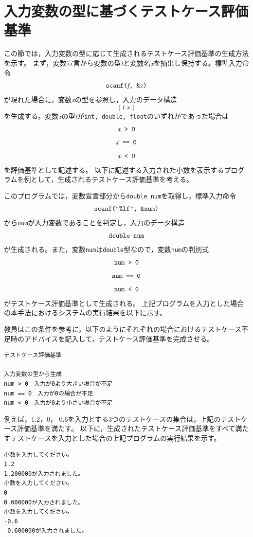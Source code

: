 \documentclass{tpu-sotu}
\begin{document}
\section{入力変数の型に基づくテストケース評価基準}
この節では，入力変数の型に応じて生成されるテストケース評価基準の生成方法を示す。
まず，変数宣言から変数の型{\it t}と変数名{\it x}を抽出し保持する。標準入力命令\\
\[ 
\mbox{{\tt {scanf({\it f}, \&{\it x})}}}
\]
が現れた場合に，変数{\it x}の型を参照し，入力のデータ構造\\
\[
(t\:x)
\]
を生成する。変数{\it x}の型{\it t}が{\tt int, double, float}のいずれかであった場合は\\
\[ 
\mbox{\tt{{\it x} > 0}} 
\]
\[
\mbox{\tt{{\it x} == 0}}
\]
\[
\mbox{\tt{{\it x} < 0}}
\]
を評価基準として記述する。
以下に記述する入力された小数を表示するプログラムを例として，生成されるテストケース評価基準を考える。

このプログラムでは，変数宣言部分から{\tt double num}を取得し，標準入力命令\\
\[ 
\mbox{{\tt {scanf("\%lf", \&num)}}}
\]
から{\tt num}が入力変数であることを判定し，入力のデータ構造\\
\[
\mbox{{\tt double num}}
\]
が生成される。また，変数{\tt num}は{\tt double}型なので，変数{\tt num}の判別式\\
\[ 
\mbox{\tt{num > 0}} 
\]
\[
\mbox{\tt{num == 0}}
\]
\[
\mbox{\tt{num < 0}}
\]
がテストケース評価基準として生成される。
上記プログラムを入力とした場合の本手法におけるシステムの実行結果を以下に示す。

教員はこの条件を参考に，以下のようにそれぞれの場合におけるテストケース不足時のアドバイスを記入して，テストケース評価基準を完成させる。
\begin{lstlisting}[xleftmargin=1cm]
テストケース評価基準

入力変数の型から生成
num > 0　入力が0より大きい場合が不足
num == 0　入力が0の場合が不足
num < 0　入力が0より小さい場合が不足
\end{lstlisting}
例えば，1.2，0，-0.6を入力とする3つのテストケースの集合は，上記のテストケース評価基準を満たす。
以下に，生成されたテストケース評価基準をすべて満たすテストケースを入力とした場合の上記プログラムの実行結果を示す。
\begin{lstlisting}[xleftmargin=1cm]
小数を入力してください。
1.2
1.200000が入力されました。
小数を入力してください。
0
0.000000が入力されました。
小数を入力してください。
-0.6
-0.600000が入力されました。
\end{lstlisting}
\end{document}
